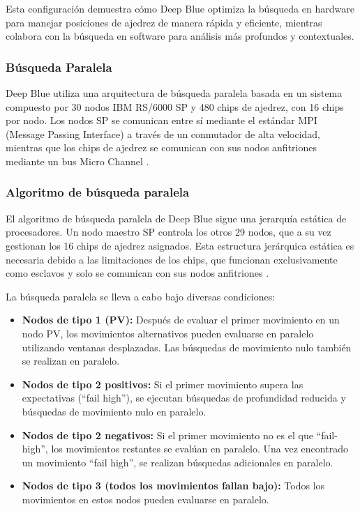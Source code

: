 \documentclass[12pt,a4paper]{article}
\begin{document}
Esta configuración demuestra cómo Deep Blue optimiza la búsqueda en hardware para manejar posiciones de ajedrez de manera rápida y eficiente, mientras colabora con la búsqueda en software para análisis más profundos y contextuales.

\subsubsection{Búsqueda Paralela}

Deep Blue utiliza una arquitectura de búsqueda paralela basada en un sistema compuesto por 30 nodos IBM RS/6000 SP y 480 chips de ajedrez, con 16 chips por nodo. Los nodos SP se comunican entre sí mediante el estándar MPI (Message Passing Interface) a través de un conmutador de alta velocidad, mientras que los chips de ajedrez se comunican con sus nodos anfitriones mediante un bus Micro Channel \cite{campbell2002deepblue} \cite{gropp1999using}.

\subsubsection*{Algoritmo de búsqueda paralela}
El algoritmo de búsqueda paralela de Deep Blue sigue una jerarquía estática de procesadores. Un nodo maestro SP controla los otros 29 nodos, que a su vez gestionan los 16 chips de ajedrez asignados. Esta estructura jerárquica estática es necesaria debido a las limitaciones de los chips, que funcionan exclusivamente como esclavos y solo se comunican con sus nodos anfitriones \cite{campbell2002deepblue}.

La búsqueda paralela se lleva a cabo bajo diversas condiciones:
\begin{itemize}
    \item \textbf{Nodos de tipo 1 (PV):} Después de evaluar el primer movimiento en un nodo PV, los movimientos alternativos pueden evaluarse en paralelo utilizando ventanas desplazadas. Las búsquedas de movimiento nulo también se realizan en paralelo.
    \item \textbf{Nodos de tipo 2 positivos:} Si el primer movimiento supera las expectativas (``fail high''), se ejecutan búsquedas de profundidad reducida y búsquedas de movimiento nulo en paralelo.
    \item \textbf{Nodos de tipo 2 negativos:} Si el primer movimiento no es el que ``fail-high'', los movimientos restantes se evalúan en paralelo. Una vez encontrado un movimiento ``fail high'', se realizan búsquedas adicionales en paralelo.
    \item \textbf{Nodos de tipo 3 (todos los movimientos fallan bajo):} Todos los movimientos en estos nodos pueden evaluarse en paralelo.
\end{itemize}
\end{document}
